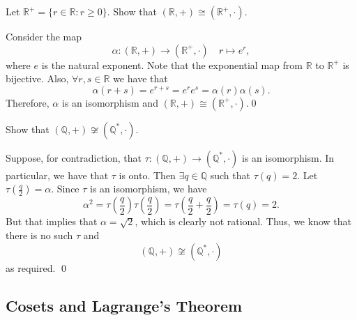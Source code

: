 \begin{eg}
  Let $\mathbb{R}^+ = \{r \in \mathbb{R} : r \geq 0 \}$. Show that $(\mathbb{R}, +) \cong (\mathbb{R}^+, \cdot)$.

  \begin{solution}
    Consider the map
    \begin{equation*}
      \alpha : (\mathbb{R}, +) \to (\mathbb{R}^+, \cdot) \quad r \mapsto e^r,
    \end{equation*}
    where $e$ is the natural exponent. Note that the exponential map from $\mathbb{R}$ to $\mathbb{R}^+$ is bijective. Also, $\forall r, s \in \mathbb{R}$ we have that
    \begin{equation*}
      \alpha(r + s) = e^{r + s} = e^r e^s = \alpha(r) \alpha(s).
    \end{equation*}
    Therefore, $\alpha$ is an isomorphism and $(\mathbb{R}, +) \cong (\mathbb{R}^+, \cdot)$.\qed
  \end{solution}
\end{eg}

\begin{eg}
  Show that $(\mathbb{Q}, +) \not\cong (\mathbb{Q}^*, \cdot)$.

  \begin{solution}
    Suppose, for contradiction, that $\tau : (\mathbb{Q}, +) \to (\mathbb{Q}^*, \cdot)$ is an isomorphism. In particular, we have that $\tau$ is onto. Then $\exists q \in \mathbb{Q}$ such that $\tau(q) = 2$. Let $\tau(\frac{q}{2}) = \alpha$. Since $\tau$ is an isomorphism, we have
    \begin{equation*}
      \alpha^2 = \tau(\frac{q}{2}) \tau(\frac{q}{2}) = \tau(\frac{q}{2} + \frac{q}{2}) = \tau(q) = 2.
    \end{equation*}
    But that implies that $\alpha = \sqrt{2}$, which is clearly not rational. Thus, we know that there is no such $\tau$ and
    \begin{equation*}
      (\mathbb{Q}, +) \not\cong (\mathbb{Q}^*, \cdot)
    \end{equation*}
    as required. \qed
  \end{solution}
\end{eg}


\subsection{Cosets and Lagrange's Theorem}%
\label{sub:cosets_and_lagrange_s_theorem}

